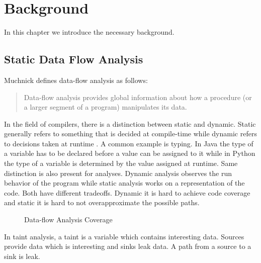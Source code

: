 \documentclass[../draft.tex]{subfiles}
\begin{document}
    \chapter{Background}
    In this chapter we introduce the necessary background.

    \section{Static Data Flow Analysis}
    Muchnick \cite{Muchnick1997} defines data-flow analysis as follows:
    \begin{quote}
        Data-flow analysis provides global information about how a procedure (or a larger segment of a program) manipulates its data.
    \end{quote}
     
    In the field of compilers, there is a distinction between static and dynamic. Static generally refers to something that is decided at compile-time while dynamic refers to decisions taken at runtime \cite{Aho1986}. A common example is typing. In Java the type of a variable has to be declared before a value can be assigned to it while in Python the type of a variable is determined by the value assigned at runtime. Same distinction is also present for analyses. Dynamic analysis observes the run behavior of the program while static analysis works on a representation of the code. Both have different tradeoffs. Dynamic it is hard to achieve code coverage and static it is hard to not overapproximate the possible paths. 
    \begin{figure}[ht]
        \centering
        \caption{Data-flow Analysis Coverage}
    \end{figure}


    In taint analysis, a taint is a variable which contains interesting data. Sources provide data which is interesting and sinks leak data. A path from a source to a sink is leak.
\end{document}
